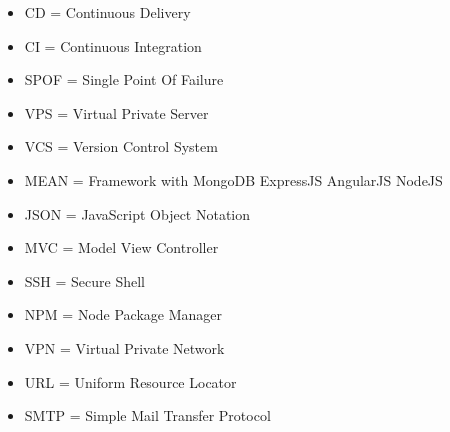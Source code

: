 \begin{itemize}
  \item CD = Continuous Delivery
  \item CI = Continuous Integration
  \item SPOF = Single Point Of Failure
  \item VPS = Virtual Private Server
  \item VCS = Version Control System
  \item MEAN = Framework with MongoDB ExpressJS AngularJS NodeJS
  \item JSON = JavaScript Object Notation
  \item MVC = Model View Controller
  \item SSH = Secure Shell
  \item NPM = Node Package Manager
  \item VPN = Virtual Private Network
  \item URL = Uniform Resource Locator
  \item SMTP = Simple Mail Transfer Protocol
\end{itemize}
